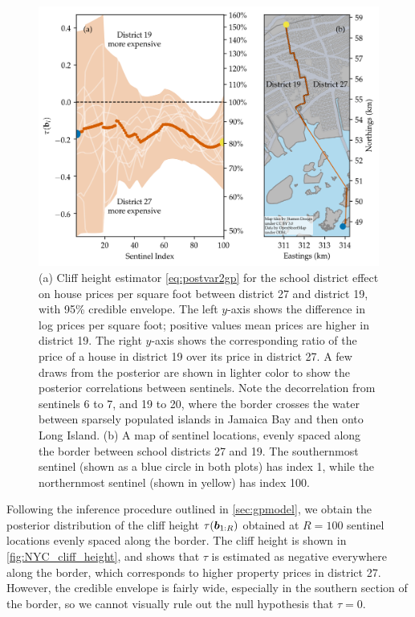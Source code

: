 \begin{figure}[tb]
    \centering
    \includegraphics[height=0.35\textheight]{figures/NYC_cliff_face.png}
    \caption{\label{fig:NYC_cliff_height}
        (a)
        Cliff height estimator \autoref{eq:postvar2gp} for the school district effect on house prices per square foot between district 27 and district 19, with 95\% credible envelope.
        The left \(y\)-axis shows the difference in log prices per square foot; positive values mean prices are higher in district 19.
        The right \(y\)-axis shows the corresponding ratio of the price of a house in district 19 over its price in district 27.
        A few draws from the posterior are shown in lighter color to show the posterior correlations between sentinels.
        Note the decorrelation from sentinels 6 to 7, and 19 to 20, where the border crosses the water between sparsely populated islands in Jamaica Bay and then onto Long Island.
        (b)
        A map of sentinel locations, evenly spaced along the border between school districts 27 and 19.
        The southernmost sentinel (shown as a blue circle in both plots) has index 1, while the northernmost sentinel (shown in yellow) has index 100.
    }
\end{figure}

Following the inference procedure outlined in \autoref{sec:gpmodel}, we obtain the posterior distribution of the cliff height \(\tau(\bm{b}_{1:R})\) obtained at \(R=100\) sentinel locations evenly spaced along the border.
The cliff height is shown in \autoref{fig:NYC_cliff_height}, and shows that \(\tau\) is estimated as negative everywhere along the border, which corresponds to higher property prices in district 27.
However, the credible envelope is fairly wide, especially in the southern section of the border, so we cannot visually rule out the null hypothesis that \(\tau=0\).

